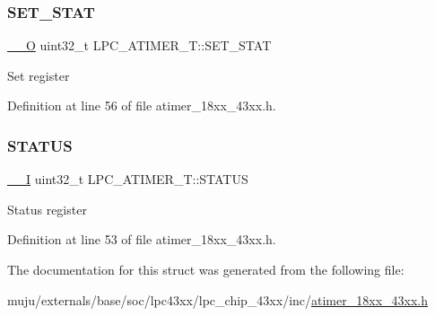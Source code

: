 \subsubsection{\texorpdfstring{S\+E\+T\+\_\+\+S\+T\+AT}{SET\_STAT}}
{\footnotesize\ttfamily \hyperlink{core__sc300_8h_a7e25d9380f9ef903923964322e71f2f6}{\+\_\+\+\_\+O} uint32\+\_\+t L\+P\+C\+\_\+\+A\+T\+I\+M\+E\+R\+\_\+\+T\+::\+S\+E\+T\+\_\+\+S\+T\+AT}

Set register 

Definition at line 56 of file atimer\+\_\+18xx\+\_\+43xx.\+h.

\mbox{\label{struct_l_p_c___a_t_i_m_e_r___t_a11836e2d7e9004b04fd7a3be8990fb73}} 
\subsubsection{\texorpdfstring{S\+T\+A\+T\+US}{STATUS}}
{\footnotesize\ttfamily \hyperlink{core__sc300_8h_af63697ed9952cc71e1225efe205f6cd3}{\+\_\+\+\_\+I} uint32\+\_\+t L\+P\+C\+\_\+\+A\+T\+I\+M\+E\+R\+\_\+\+T\+::\+S\+T\+A\+T\+US}

Status register 

Definition at line 53 of file atimer\+\_\+18xx\+\_\+43xx.\+h.



The documentation for this struct was generated from the following file\+:\begin{DoxyCompactItemize}
\item 
muju/externals/base/soc/lpc43xx/lpc\+\_\+chip\+\_\+43xx/inc/\hyperlink{atimer__18xx__43xx_8h}{atimer\+\_\+18xx\+\_\+43xx.\+h}\end{DoxyCompactItemize}
